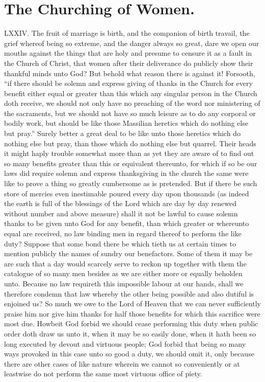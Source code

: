 \section*{The Churching of Women.}
LXXIV. The fruit of marriage is birth, and the companion of birth travail, the grief whereof being so extreme, and the danger always so great, dare we open our mouths against the things that are holy and presume to censure it as a fault in the Church of Christ, that women after their deliverance do publicly show their thankful minds unto God? But behold what reason there is against it! Forsooth, “if there should be solemn and express giving of thanks in the Church for every benefit either equal or greater than this which any singular person in the Church doth receive, we should not only have no preaching of the word nor ministering of the sacraments, but we should not have so much leisure as to do any corporal or bodily work, but should be like those Massilian heretics which do nothing else but pray.” Surely better a great deal to be like unto those heretics which do nothing else but pray, than those which do nothing else but quarrel. Their heads it might haply trouble somewhat  more than as yet they are aware of to find out so many benefits greater than this or equivalent thereunto,
 for which if so be our laws did require solemn and express thanksgiving in the church the same were like to prove a thing so greatly cumbersome as is pretended. But if there be such store of mercies even inestimable poured every day upon thousands (as indeed the earth is full of the blessings of the Lord which are day by day renewed without number and above measure) shall it not be lawful to cause solemn thanks to be given unto God for any benefit, than which greater or whereunto equal are received, no law binding men in regard thereof to perform the like duty? Suppose that some bond there be which tieth us at certain times to mention publicly the names of sundry our benefactors. Some of them it may be are such that a day would scarcely serve to reckon up together with them the catalogue of so many men besides as we are either more or equally beholden unto. Because no law requireth this impossible labour at our hands, shall we therefore condemn that law whereby the other being possible and also dutiful is enjoined us? So much we owe to the Lord of Heaven that we can never sufficiently praise him nor give him thanks for half those benefits for which this sacrifice were most due. Howbeit God forbid we should cease performing this duty when public order doth draw us unto it, when it may be so easily done, when it hath been so long executed by devout and virtuous people; God forbid that being so many ways provoked in this case unto so good a duty, we should omit it, only because there are other cases of like nature wherein we cannot so conveniently or at leastwise do not perform the same most virtuous office of piety.

